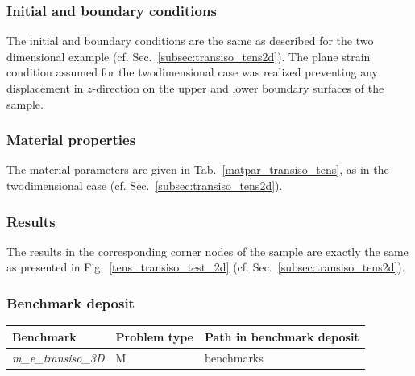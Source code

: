 \subsubsection*{Initial and boundary conditions}

The initial and boundary conditions are the same as described for the two dimensional example  (cf. Sec.~\ref{subsec:transiso_tens2d}). The plane strain condition assumed for the twodimensional case was realized preventing any displacement in $z$-direction on the upper and lower boundary surfaces of the sample.

\subsubsection*{Material properties}

The material parameters are given in Tab.~\ref{matpar_transiso_tens}, as in the twodimensional case (cf. Sec.~\ref{subsec:transiso_tens2d}).

\subsubsection*{Results}

The results in the corresponding corner nodes of the sample are exactly the same as presented in Fig.~\ref{tens_transiso_test_2d} (cf. Sec.~\ref{subsec:transiso_tens2d}).

\subsubsection*{Benchmark deposit}

\begin{tabular}{|l|l|l|}
  \hline
  Benchmark & Problem type & Path in benchmark deposit \\
  \hline
 \emph{m\_e\_transiso\_3D} & M & benchmarks\verb \M\elasticity \\
  \hline
\end{tabular}

